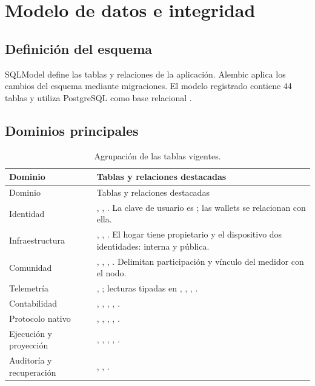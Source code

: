 \section{Modelo de datos e integridad}
\subsection{Definición del esquema}
SQLModel define las tablas y relaciones de la aplicación. Alembic aplica los cambios del esquema mediante migraciones. El modelo registrado contiene 44 tablas y utiliza PostgreSQL como base relacional \citep{database,models}.

\subsection{Dominios principales}
\begin{longtable}{L{.25\linewidth}L{.65\linewidth}}
\caption{Agrupación de las tablas vigentes.}\label{tab:dominios}\\
\toprule Dominio & Tablas y relaciones destacadas \\ \midrule\endfirsthead
\toprule Dominio & Tablas y relaciones destacadas \\ \midrule\endhead
Identidad & , , . La clave de usuario es ; las wallets se relacionan con ella.\\
Infraestructura & , , . El hogar tiene propietario y el dispositivo dos identidades: interna y pública.\\
Comunidad & , , , . Delimitan participación y vínculo del medidor con el nodo.\\
Telemetría & , ; lecturas tipadas en , , , .\\
Contabilidad & , , , , .\\
Protocolo nativo & , , , , .\\
Ejecución y proyección & , , , , .\\
Auditoría y recuperación & , , .\\
\bottomrule
\end{longtable}


